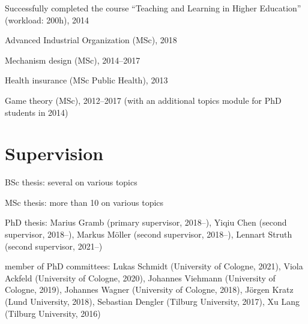 \documentclass[a4paper]{article}
\renewenvironment{itemize}{
  \begin{list}{}{
    \setlength{\leftmargin}{1.5em}
  }
}{
  \end{list}
}
\begin{document}
Successfully completed the course ``Teaching and Learning in Higher Education'' (workload: 200h), 2014

\begin{itemize}
  \item Advanced Industrial Organization (MSc), 2018
\item Mechanism design (MSc), 2014--2017
\item Health insurance (MSc Public Health), 2013
\item Game theory (MSc), 2012--2017 (with an additional topics module for PhD students in 2014)
\end{itemize}





\section*{Supervision}

\begin{itemize}
\item BSc thesis: several on various topics
\item MSc thesis: more than 10 on various topics
\item PhD thesis: Marius Gramb (primary supervisor, 2018--), Yiqiu Chen (second supervisor, 2018--), Markus M\"oller (second supervisor, 2018--), Lennart Struth (second supervisor, 2021--)
\item member of PhD committees: Lukas Schmidt (University of Cologne, 2021), Viola Ackfeld (University of Cologne, 2020), Johannes Viehmann (University of Cologne, 2019), Johannes Wagner (University of Cologne, 2018), J\"orgen Kratz (Lund University, 2018), Sebastian Dengler (Tilburg University, 2017), Xu Lang (Tilburg University, 2016)
\end{itemize}
\end{document}
